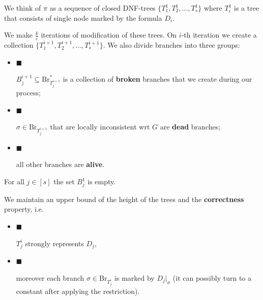 We think of $\pi$ as a sequence of closed DNF-trees $\{T^{1}_{1},T^{1}_{2},\dots,T^{1}_{s}\}$
where $T^{1}_{i}$ is a tree that consists of single node marked by the formula $D_{i}$.\par




We make $\frac{k}{\varepsilon}$ iterations of modification of these trees. On $i$-th iteration we create
a collection $\{T^{i+1}_{1},T^{i+1}_{2},\dots,T^{i+1}_{s}\}$. We also divide branches into three
groups:\par


\begin{itemize}


\item[] 
$\blacksquare$ 


$B^{i+1}_{j}\subseteq\mathrm{Br}^{*}_{T^{i+1}_{j}}$ is a collection of \textbf{broken} branches that
we create during our process;\par





\item[] 
$\blacksquare$ 


$\sigma\in\mathrm{Br}_{T^{i+1}_{j}}$ that are locally inconsistent wrt $G$ are \textbf{dead} branches;\par





\item[] 
$\blacksquare$ 


all other branches are \textbf{alive}.\par





\end{itemize}


For all $j\in[s]$ the set $B^{1}_{j}$ is empty.\par




We maintain an upper bound of the height of the trees and the \textbf{correctness} property, i.e.\par


\begin{itemize}


\item[] 
$\blacksquare$ 


$T^{i}_{j}$ strongly represents $D_{j}$,\par





\item[] 
$\blacksquare$ 


moreover each branch $\sigma\in\mathrm{Br}_{T^{i}_{j}}$ is marked by $D_{j}|_{\sigma}$ (it can possibly
turn to a constant after applying the restriction).\par





\end{itemize}


